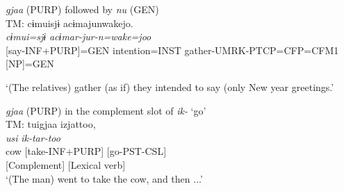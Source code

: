 \begin{exe}
\begin{xlist}
\ex\label{ex:4.34b} \textit{gjaa} (PURP) followed by \textit{nu} (GEN)\hfill\relax[Co: 111113\_01.txt]\\
 {TM:}  {cɨmuisjɨ} {acɨmajunwakejo.}\\
   {\itshape cɨmui=sjɨ} {\itshape acɨmar-jur-n=wake=joo}\\
  {[say-INF+PURP]=GEN} {intention=INST} {gather-UMRK-PTCP=CFP=CFM1}\\
  {[NP]=GEN}\\
  \glt{} \parbox{\linewidth-\widthof{TM:}}{‘(The relatives) gather (as if) they intended to say (only New year greetings.’}

\ex\label{ex:4.34c} \textit{gjaa} (PURP) in the complement slot of \textit{ik-} ‘go’\hfill\relax[Fo: 090307\_00.txt]\\
 {TM:}  {tuigjaa} {izjattoo,}\\
  {\itshape usi}  {\itshape ik-tar-too}\\
  {cow} {[take-INF+PURP]} {[go-PST-CSL]}\\
   {} {[Complement]} {[Lexical verb]}\\
  \glt{} ‘(The man) went to take the cow, and then ...’
  

\end{xlist}
\end{exe}
